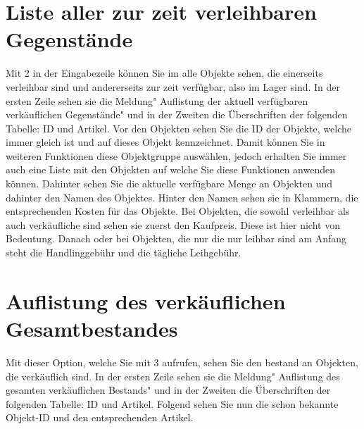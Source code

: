 ﻿\documentclass[a4paper,12pt,titlepage]{article}
\begin{document}
\section{Liste aller zur zeit verleihbaren Gegenstände}
Mit 2 in der Eingabezeile können Sie im alle Objekte sehen, die einerseits verleihbar sind und andererseits zur zeit verfügbar, also im Lager sind.
In der ersten Zeile sehen sie die Meldung" Auflistung der aktuell verfügbaren verkäuflichen Gegenstände" und in der Zweiten die Überschriften der folgenden Tabelle: ID und Artikel.
Vor den Objekten sehen Sie die ID der Objekte, welche immer gleich ist und auf dieses Objekt kennzeichnet. Damit können Sie in weiteren Funktionen diese Objektgruppe auswählen, jedoch erhalten Sie immer auch eine Liste mit den Objekten auf welche Sie diese Funktionen anwenden können.
Dahinter sehen Sie die aktuelle verfügbare Menge an Objekten und dahinter den Namen des Objektes.
Hinter den Namen sehen sie in Klammern, die entsprechenden Kosten für das Objekte. Bei Objekten, die sowohl verleihbar als auch verkäufliche sind sehen sie zuerst den Kaufpreis. Diese ist hier nicht von Bedeutung. Danach oder bei Objekten, die nur die nur leihbar sind am Anfang steht die Handlinggebühr und die tägliche Leihgebühr.
\section{Auflistung des verkäuflichen Gesamtbestandes}
Mit dieser Option, welche Sie mit 3 aufrufen, sehen Sie den bestand an Objekten, die verkäuflich sind.
 In der ersten Zeile sehen sie die Meldung" Auflistung des gesamten verkäuflichen Bestands" und in der Zweiten die Überschriften der folgenden Tabelle: ID und Artikel.
Folgend sehen Sie nun die schon bekannte Objekt-ID und den entsprechenden Artikel.
\end{document}
